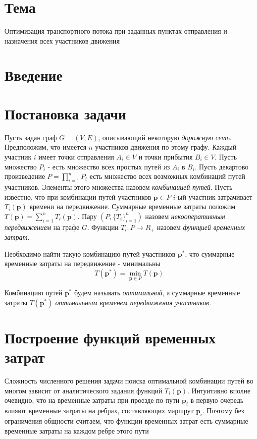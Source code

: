 \documentclass[12pt, a4paper]{article}
\DeclareMathOperator*{\minn}{min}
\begin{document}
 \section*{Тема}
Оптимизация транспортного потока при заданных пунктах отправления и назначения всех участников движения


\section{Введение}


\newpage
\section{Постановка задачи}

Пусть задан граф $G = (V, E)$, описывающий некоторую \textit{дорожную сеть}. Предположим, что имеется $n$ участников движения по этому графу. Каждый участник $i$ имеет точки отправления $A_i \in V$ и точки прибытия $B_i \in V$. Пусть множество $P_i$ - есть множество всех простых путей из $A_i$ в $B_i$. Пусть декартово произведение $P = \prod \limits_{i = 1} ^ n P_i$ есть множество всех возможных комбинаций путей участников. Элементы этого множества назовем \textit{комбинацией путей}. Пусть известно, что при комбинации путей участников $\textbf{p} \in P$ $i$-ый участник затрачивает $T_i(\textbf{p})$ времени на передвижение. Суммарные временные затраты положим $T(\textbf{p}) = \sum\limits_{i = 1}^n T_i (\textbf{p})$. Пару $(P, \{T_i\}_{i = 1} ^ n)$ назовем \textit{некооперативным передвижением} на графе $G$. Функции $T_i: P \rightarrow R_+$ назовем \textit{функцией временных затрат}.

Необходимо найти такую комбинацию путей участников $\textbf{p}^*$, что суммарные временные затраты на передвижение - минимальны
\begin{equation}
\label{eq:target_task_T} 
T (\textbf{p}^*) = \minn\limits_{ \textbf{p} \in P} T (\textbf{p})
\end{equation}
	
Комбинацию путей $\textbf{p}^*$ будем называть \textit {оптимальной}, а суммарные временные затраты  $ T (\textbf{p}^*)$ \textit {оптимальным временем передвижения участников}.

\newpage
\section{Построение функций временных затрат}

Сложность численного решения задачи поиска оптимальной комбинации путей во многом зависит от аналитического задания функций
$T_i (\textbf{p})$. Интуитивно вполне очевидно, что на временные затраты при проезде по пути $\textbf{p}_i$ в первую очередь влияют временные затраты на ребрах, составляющих маршрут $\textbf{p}_i$. Поэтому без ограничения общности считаем, что функции временных затрат есть суммарные временные затраты на каждом ребре этого пути
\end{document}
